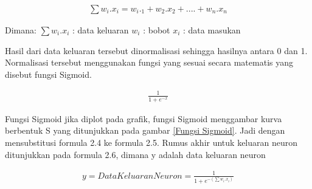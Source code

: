 \begin{equation}
	\begin{aligned}
		\sum w_{i}.x_{i}=w_{i}._{1}+w_{2}.x_{2}+....+w_{n}.x_{n}
	\end{aligned}
\end{equation}

Dimana:
\newline
$\sum w_{i}.x_{i}$ 		\hspace{0.4cm}: data keluaran \newline
$w_{i}$ 	\hspace{1.3cm}: bobot \newline
$x_{i}$ 	\hspace{1.4cm}: data masukan \newline

Hasil dari data keluaran tersebut dinormalisasi sehingga hasilnya antara 0 dan 1. Normalisasi tersebut menggunakan fungsi yang sesuai secara matematis yang disebut fungsi Sigmoid.

\begin{equation}
 	\begin{aligned}
 		\frac{1}{1+e^{-x}}
 	\end{aligned}
\end{equation}


Fungsi Sigmoid jika diplot pada grafik, fungsi Sigmoid menggambar kurva berbentuk S yang ditunjukkan pada gambar \ref{Fungsi Sigmoid}. Jadi dengan mensubstitusi formula 2.4 ke formula 2.5. Rumus akhir untuk keluaran neuron ditunjukkan pada formula 2.6, dimana y adalah data keluaran neuron

\begin{equation}
	\begin{aligned}
		y = Data Keluaran Neuron = \frac{1}{1+e^{-(\sum w_{i}.x_{i})}}
	\end{aligned}
\end{equation}

